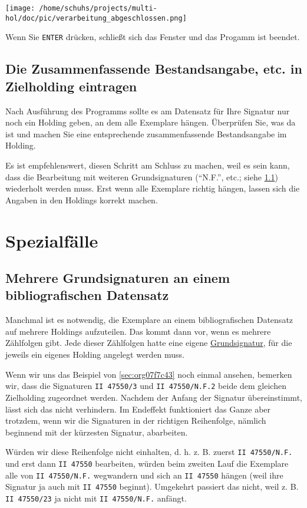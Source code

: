 \documentclass[10pt, a4paper]{scrartcl}
\begin{document}
\begin{center}
\texttt{[image: /home/schuhs/projects/multi-hol/doc/pic/verarbeitung\_abgeschlossen.png]}
\end{center}

Wenn Sie \texttt{ENTER} drücken, schließt sich das Fenster und das Progamm ist beendet.
\subsection{Die Zusammenfassende Bestandsangabe, etc. in Zielholding eintragen}
\label{sec:orgc1ce1b4}
Nach Ausführung des Programms sollte es am Datensatz für Ihre Signatur nur
noch ein Holding geben, an dem alle Exemplare hängen. Überprüfen Sie, was
da ist und machen Sie eine entsprechende zusammenfassende Bestandsangabe
im Holding.

Es ist empfehlenswert, diesen Schritt am Schluss zu machen, weil es sein
kann, dass die Bearbeitung mit weiteren Grundsignaturen ("`N.F."', etc.;
siehe \ref{sec:orgb796197})
wiederholt werden muss. Erst wenn alle Exemplare richtig hängen, lassen
sich die Angaben in den Holdings korrekt machen.
\section{Spezialfälle}
\label{sec:orgfdce096}
\subsection{Mehrere Grundsignaturen an einem bibliografischen Datensatz}
\label{sec:orgb796197}
Manchmal ist es notwendig, die Exemplare an einem bibliografischen
Datensatz auf mehrere Holdings aufzuteilen. Das kommt dann vor, wenn es
mehrere Zählfolgen gibt. Jede dieser Zählfolgen hatte eine eigene \hyperref[sec:orgae5af92]{Grundsignatur}, 
für die jeweils ein eigenes Holding angelegt werden muss.

Wenn wir uns das Beispiel von \ref{sec:org07f7c43} noch einmal ansehen,
bemerken wir, dass die Signaturen \texttt{II 47550/3} und \texttt{II 47550/N.F.2} beide
dem gleichen Zielholding zugeordnet werden. Nachdem der Anfang der
Signatur übereinstimmt, lässt sich das nicht verhindern. Im Endeffekt
funktioniert das Ganze aber trotzdem, wenn wir die Signaturen in der richtigen
Reihenfolge, nämlich beginnend mit der kürzesten Signatur, abarbeiten.

Würden wir diese Reihenfolge nicht einhalten, d. h. z. B. zuerst \texttt{II
      47550/N.F.} und erst dann \texttt{II 47550} bearbeiten, würden beim zweiten Lauf
die Exemplare alle von \texttt{II 47550/N.F.} wegwandern und sich an \texttt{II 47550}
hängen (weil ihre Signatur ja auch mit \texttt{II 47550} beginnt). Umgekehrt
passiert das nicht, weil z. B. \texttt{II 47550/23} ja nicht mit \texttt{II 47550/N.F.}
anfängt.
\end{document}
